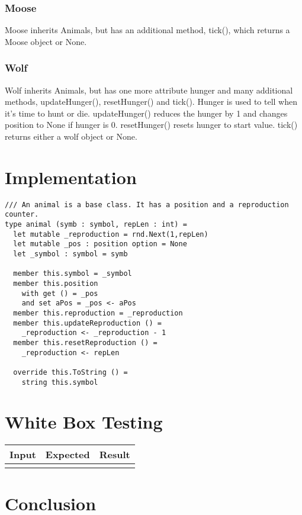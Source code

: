 \documentclass{article}
\begin{document}
    \subsubsection{Moose}
    	Moose inherits Animals, but has an additional method, tick(), which returns a Moose object or None.
    \subsubsection{Wolf}    
		Wolf inherits Animals, but has one more attribute hunger and many additional methods, updateHunger(), resetHunger() and tick(). Hunger is used to tell when it's time to hunt or die. updateHunger() reduces the hunger by 1 and changes position to None if hunger is 0. resetHunger() resets hunger to start value. tick() returns either a wolf object or None. 
    \section{Implementation}
		\lstset{language=FSharp}

		\begin{lstlisting}
/// An animal is a base class. It has a position and a reproduction counter.
type animal (symb : symbol, repLen : int) =
  let mutable _reproduction = rnd.Next(1,repLen)
  let mutable _pos : position option = None
  let _symbol : symbol = symb

  member this.symbol = _symbol
  member this.position
    with get () = _pos
    and set aPos = _pos <- aPos
  member this.reproduction = _reproduction
  member this.updateReproduction () =
    _reproduction <- _reproduction - 1
  member this.resetReproduction () =
    _reproduction <- repLen

  override this.ToString () =
    string this.symbol
		\end{lstlisting}
		
         
    \section{White Box Testing}
   	   \begin{tabular}{|c|c|c|}
   	   		\hline
   	   		Input & Expected & Result\\
   	   		\hline
   	   		&&\\
   	   		\hline
   	   \end{tabular}
    \section{Conclusion}
     
\end{document}
